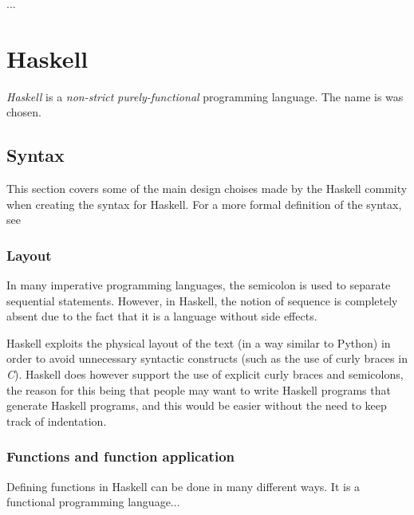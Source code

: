 ...





\section{Haskell}


\emph{Haskell} is a \emph{non-strict} \emph{purely-functional} programming language. The
name is was chosen. \cite{hudak2007history}


\subsection{Syntax}

This section covers some of the main design choises made by the Haskell commity when
creating the syntax for Haskell. For a more formal definition of the syntax, 
see \cite{jones2003haskell} 

\subsubsection {Layout}

In many imperative programming languages, the semicolon is used to separate sequential
statements. However, in Haskell, the notion of sequence is completely absent due to the
fact that it is a language without side effects. \cite{hudak2007history}

Haskell exploits the physical layout of the text (in a way similar to Python) in order
to avoid unnecessary syntactic constructs (such as the use of curly braces in \emph{C}).
Haskell does however support the use of explicit curly braces and semicolons, the reason
for this being that people may want to write Haskell programs that generate Haskell programs,
and this would be easier without the need to keep track of indentation. \cite{hudak2007history}

\subsubsection{Functions and function application}

Defining functions in Haskell can be done in many different ways. It is a functional programming
language...

